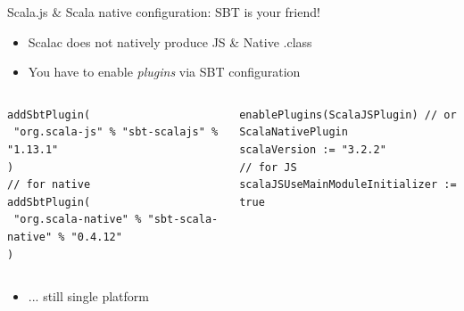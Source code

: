 \documentclass[presentation, 9pt]{beamer}\mode<presentation>{\usetheme{AMSBolognaFC}}
\begin{document}
\begin{frame}[fragile]{Scala.js \& Scala native configuration: SBT is your friend! \href{https://github.com/unibo-pps/scala-native-js-configuration}{\faLink}}
	\begin{itemize}
		\item Scalac does not natively produce JS \& Native .class
  	\item You have to enable \emph{plugins} via SBT configuration 
	\end{itemize}
	\begin{columns}
		\begin{column}[c]{0.5\textwidth}
			\begin{tcolorbox}[left=0pt, top=0pt, bottom=0pt, title=project/plugins.sbt]
				\begin{verbatim}
addSbtPlugin(
 "org.scala-js" % "sbt-scalajs" % "1.13.1"
)
// for native
addSbtPlugin(
 "org.scala-native" % "sbt-scala-native" % "0.4.12"
)
				\end{verbatim}
			\end{tcolorbox}
		\end{column}

		\begin{column}[c]{0.5\textwidth}
			\begin{tcolorbox}[left=0pt, top=0pt, bottom=0pt, title=build.sbt]
				\begin{verbatim}
enablePlugins(ScalaJSPlugin) // or ScalaNativePlugin
scalaVersion := "3.2.2"
// for JS
scalaJSUseMainModuleInitializer := true
				\end{verbatim}
			\end{tcolorbox}
		\end{column}
	\end{columns}
	
	\begin{itemize}
		\item ... still single platform
	\end{itemize}
\end{frame}
\end{document}

